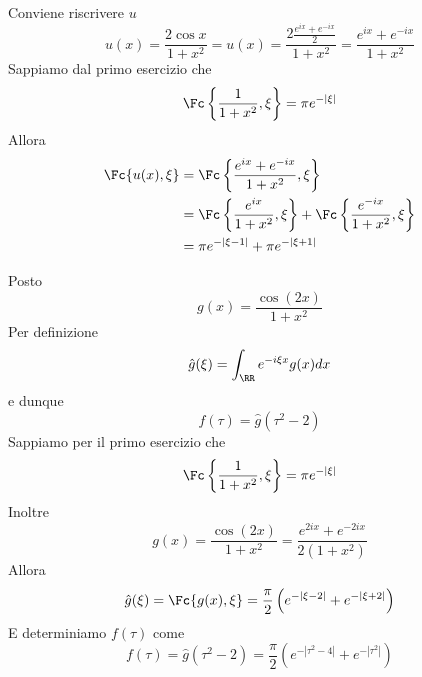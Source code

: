 \Soluzione

Conviene riscrivere $u$
\begin{equation*}
u(x) = \frac{2\cos x}{1 + x^{2}} = u(x) = \frac{2\frac{e^{ix} + e^{- ix}}{2}}{1 + x^{2}} = \frac{e^{ix} + e^{- ix}}{1 + x^{2}}
\end{equation*}
Sappiamo dal primo esercizio che
\begin{equation*}
\Fc \left\{\frac{1}{1 + x^{2}}, \xi \right\} = \pi e^{- | \xi |}
\end{equation*}
Allora
\begin{equation*}
\begin{aligned}
\Fc \{u(x), \xi \} & = \Fc \left\{\frac{e^{ix} + e^{- ix}}{1 + x^{2}}, \xi \right\}\\
 & = \Fc \left\{\frac{e^{ix}}{1 + x^{2}}, \xi \right\} + \Fc \left\{\frac{e^{- ix}}{1 + x^{2}}, \xi \right\}\\
 & = \pi e^{- | \xi - 1|} + \pi e^{- | \xi + 1|}
\end{aligned}
\end{equation*}

\Soluzione

Posto
\begin{equation*}
g(x) = \frac{\cos(2x)}{1 + x^{2}}
\end{equation*}
Per definizione
\begin{equation*}
\hat{g}(\xi) = \int_{\RR} e^{- i\xi x} g(x) dx
\end{equation*}
e dunque
\begin{equation*}
f(\tau) = \hat{g}\left(\tau^{2} - 2\right)
\end{equation*}
Sappiamo per il primo esercizio che
\begin{equation*}
\Fc \left\{\frac{1}{1 + x^{2}}, \xi \right\} = \pi e^{- | \xi |}
\end{equation*}
Inoltre
\begin{equation*}
g(x) = \frac{\cos(2x)}{1 + x^{2}} = \frac{e^{2ix} + e^{- 2ix}}{2\left(1 + x^{2}\right)}
\end{equation*}
Allora
\begin{equation*}
\hat{g}(\xi) = \Fc \{g(x), \xi \} = \frac{\pi}{2}\left(e^{- | \xi - 2|} + e^{- | \xi + 2|}\right)
\end{equation*}
E determiniamo $f(\tau)$ come
\begin{equation*}
f(\tau) = \hat{g}\left(\tau^{2} - 2\right) = \frac{\pi}{2}\left(e^{- \left| \tau^{2} - 4\right|} + e^{- \left| \tau^{2}\right|}\right)
\end{equation*}

